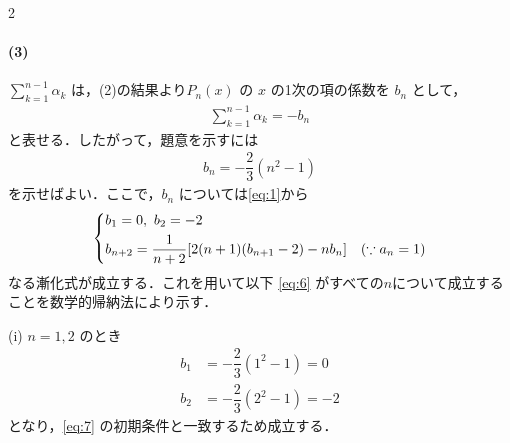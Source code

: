 \documentclass[../../main.tex]{subfiles}
\begin{document}
\begin{multicols}{2}
  \paragraph{(3)}
  $\displaystyle \sum_{k=1}^{n-1} \alpha_k$ は，(2)の結果より$P_n(x)$ の $x$ の1次の項の係数を $b_n$ として，
  \begin{align}\label{eq:5}
    \sum_{k=1}^{n-1} \alpha_k = -b_n
  \end{align}
  と表せる．したがって，題意を示すには
  \begin{align}\label{eq:6}
    b_n = -\dfrac{2}{3}(n^2 - 1)
  \end{align}
  を示せばよい．ここで，$b_n$ については\cref{eq:1}から
  \begin{align}\label{eq:7}
    \begin{dcases}
      b_1 = 0, \ b_2 = -2 \\
      b_{n+2} = \dfrac{1}{n+2} [2(n+1)(b_{n+1} - 2) - n b_n] \quad (\because a_n=1)
    \end{dcases}
  \end{align}
  なる漸化式が成立する．これを用いて以下 \cref{eq:6} がすべての$n$について成立することを数学的帰納法により示す．

  (i) $n=1, 2$ のとき
  \begin{align}
    b_1 & = -\dfrac{2}{3}(1^2-1) = 0  \\
    b_2 & = -\dfrac{2}{3}(2^2-1) = -2
  \end{align}
  となり，\cref{eq:7} の初期条件と一致するため成立する．


\end{multicols}
\end{document}
